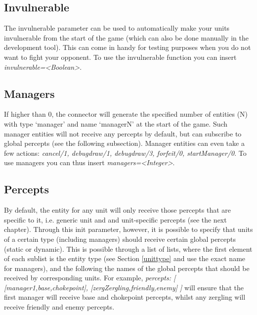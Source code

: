 \subsection{Invulnerable}
\label{invulnerable}
The invulnerable parameter can be used to automatically make your units invulnerable from the start of the game (which can also be done manually in the development tool). This can come in handy for testing purposes when you do not want to fight your opponent. To use the invulnerable function you can insert \textit{invulnerable=<Boolean>}.

\subsection{Managers}
\label{managers}
If higher than 0, the connector will generate the specified number of entities (N) with type `manager' and name `managerN' at the start of the game. Such manager entities will not receive any percepts by default, but can subscribe to global percepts (see the following subsection). Manager entities can even take a few actions: \textit{cancel/1, debugdraw/1, debugdraw/3, forfeit/0, startManager/0}. To use managers you can thus insert \textit{managers=<Integer>}.

\pagebreak
\subsection{Percepts}
\label{percepts}
By default, the entity for any unit will only receive those percepts that are specific to it, i.e. generic unit and and unit-specific percepts (see the next chapter). Through this init parameter, however, it is possible to specify that units of a certain type (including managers) should receive certain global percepts (static or dynamic).  This is possible through a list of lists, where the first element of each sublist is the entity type (see Section \ref{unittype} and use the exact name for managers), and the following the names of the global percepts that should be received by corresponding units. For example, \textit{percepts: [ [manager1,base,chokepoint], [zergZergling,friendly,enemy] ]} will ensure that the first manager will receive base and chokepoint percepts, whilst any zergling will receive friendly and enemy percepts.

